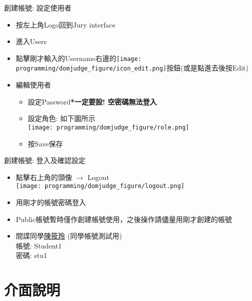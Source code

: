 \documentclass[aspectratio=169,xcolor=dvipsnames]{beamer}
\begin{document}
    \begin{frame}{創建帳號: 設定使用者}
        \begin{itemize}
            \item 按左上角Logo回到Jury interface
            \item 進入Users
            \item 點擊剛才輸入的Username右邊的\texttt{[image: programming/domjudge\_figure/icon\_edit.png]}按鈕(或是點進去後按Edit)
            \item 編輯使用者
                \begin{itemize}
                    \item 設定Password\textbf{*一定要設! 空密碼無法登入}
                    \item 設定角色: 如下圖所示\\
                    \texttt{[image: programming/domjudge\_figure/role.png]}
                    \item 按Save保存
                \end{itemize}
        \end{itemize}
    \end{frame}
    
    \begin{frame}{創建帳號: 登入及確認設定}
        \begin{itemize}
            \item 點擊右上角的頭像 $\rightarrow$ Logout \\
            \texttt{[image: programming/domjudge\_figure/logout.png]}
            \item 用剛才的帳號密碼登入
            \item Public帳號暫時僅作創建帳號使用，之後操作請儘量用剛才創建的帳號
            \item 間諜同學\underline{陳筱玲} (同學帳號測試用) \\
                帳號: Student1 \\
                密碼: stu1
        \end{itemize}
    \end{frame}
    
    \section{介面說明}
\end{document}

